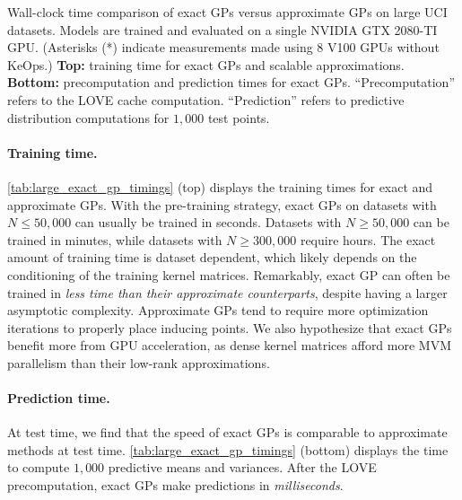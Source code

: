 \begin{table}[t!]
  \vspace{1em}
  \caption[Wall-clock time of exact GPs versus approximate GPs.]{
    Wall-clock time comparison of exact GPs versus approximate GPs on large UCI datasets.
    Models are trained and evaluated on a single NVIDIA GTX 2080-TI GPU.
    (Asterisks (*) indicate measurements made using 8 V100 GPUs without KeOps.)
    {\bf Top:} training time for exact GPs and scalable approximations.
    {\bf Bottom:} precomputation and prediction times for exact GPs.
    ``Precomputation'' refers to the LOVE cache computation.
    ``Prediction'' refers to predictive distribution computations for $1,\!000$ test points.
  }
  \label{tab:large_exact_gp_timings}
  \centering
  \vspace{1em}

  \resizebox{\textwidth}{!}{%
    
  }
  \vspace{1em}

  \resizebox{\textwidth}{!}{%
    
  }

  \vspace{2em}
\end{table}


\paragraph{Training time.}
\cref{tab:large_exact_gp_timings} (top) displays the training times for exact and approximate GPs.
With the pre-training strategy, exact GPs on datasets with $N \leq 50,\!000$ can usually be trained in seconds.
Datasets with $N \geq 50,\!000$ can be trained in minutes, while datasets with $N \geq 300,\!000$ require hours.
The exact amount of training time is dataset dependent, which likely depends on the conditioning of the training kernel matrices.
Remarkably, exact GP can often be trained in \emph{less time than their approximate counterparts}, despite having a larger asymptotic complexity.
Approximate GPs tend to require more optimization iterations to properly place inducing points.
We also hypothesize that exact GPs benefit more from GPU acceleration, as dense kernel matrices afford more MVM parallelism than their low-rank approximations.

\paragraph{Prediction time.}
At test time, we find that the speed of exact GPs is comparable to approximate methods at test time.
\cref{tab:large_exact_gp_timings} (bottom) displays the time to compute $1,\!000$ predictive means and variances.
After the LOVE precomputation, exact GPs make predictions in \emph{milliseconds}.

